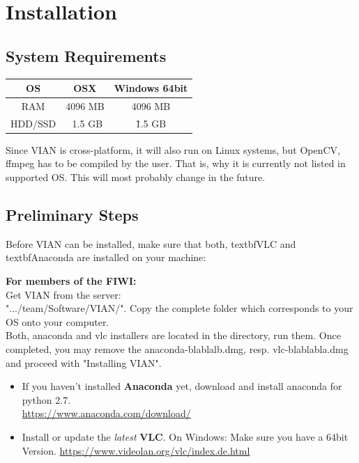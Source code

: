 \documentclass[11pt, a4paper,oneside,chapterprefix=false]{scrbook}
\begin{document}
\chapter{Installation} \label{chp:introduction}

\section{System Requirements}
\begin{center}
	\begin{tabular}{|c|c|c|}
		\hline 
		OS & OSX & Windows 64bit \\ 
		\hline 
		RAM & 4096 MB & 4096 MB \\ 
		\hline 
		HDD/SSD & ~1.5 GB & \~1.5 GB \\ 
		\hline 
	\end{tabular} 
\end{center}

Since VIAN is cross-platform, it will also run on Linux systems, but OpenCV, ffmpeg has to be compiled by the user. That is, why it is currently not listed in supported OS. This will most probably change in the future.


\section{Preliminary Steps}
Before VIAN can be installed, make sure that both, textbf{VLC} and textbf{Anaconda} are installed on your machine:\\


\begin{mdframed}[backgroundcolor=Orange] 
	\textbf{For members of the FIWI:}\\ Get VIAN from the server:\\ ".../team/Software/VIAN/". Copy the complete folder which corresponds to your OS onto your computer.\\
	Both, anaconda and vlc installers are located in the directory, run them. Once completed, you may remove the anaconda-blablalb.dmg, resp. vlc-blablabla.dmg and proceed with "Installing VIAN".

\end{mdframed}
 
\begin{itemize}
	\item If you haven't installed \textbf{Anaconda} yet, download and install anaconda for python 2.7.\\
	\url{https://www.anaconda.com/download/}
	\item Install or update the \textit{latest} \textbf{VLC}. On Windows: Make sure you have a 64bit Version.
	\url{https://www.videolan.org/vlc/index.de.html}
\end{itemize}
\end{document}
